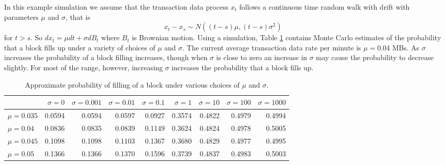 \documentclass{article}
\begin{document}
In this example simulation we assume that the transaction data process $x_t$ follows a continuous time random walk with drift with parameters $\mu$ and $\sigma$, that is
\[
x_t - x_s \sim N((t-s)\mu, (t-s)\sigma^2)
\]
for $t > s$. So $dx_t = \mu dt + \sigma d B_t$ where $B_t$ is Brownian motion. Using a simulation, Table \ref{tab:bmprob} contains Monte Carlo estimates of the probability that a block fills up under a variety of choices of $\mu$ and $\sigma$. The current average transaction data rate per minute  is $\mu=0.04$ MBs. As $\sigma$ increases the probability of a block filling increases, though when $\sigma$ is close to zero an increase in $\sigma$ may cause the probability to decrease slightly. For most of the range, however, increasing $\sigma$ increases the probability that a block fills up. 

\begin{table}[ht]
\centering
\begin{tabular}{lrrrrrrrr}
  \hline
 & $\sigma = 0$ & $\sigma = 0.001$ & $\sigma = 0.01$ & $\sigma = 0.1$ & $\sigma = 1$ & $\sigma = 10$ & $\sigma = 100$ & $\sigma = 1000$ \\ 
  \hline
$\mu = 0.035$ & 0.0594 & 0.0594 & 0.0597 & 0.0927 & 0.3574 & 0.4822 & 0.4979 & 0.4994 \\ 
  $\mu = 0.04$ & 0.0836 & 0.0835 & 0.0839 & 0.1149 & 0.3624 & 0.4824 & 0.4978 & 0.5005 \\ 
  $\mu = 0.045$ & 0.1098 & 0.1098 & 0.1103 & 0.1367 & 0.3680 & 0.4829 & 0.4977 & 0.4995 \\ 
  $\mu = 0.05$ & 0.1366 & 0.1366 & 0.1370 & 0.1596 & 0.3739 & 0.4837 & 0.4983 & 0.5003 \\ 
   \hline
\end{tabular}
\caption{Approximate probability of filling of a block under various choices of $\mu$ and $\sigma$.}
\label{tab:bmprob}
\end{table}
\end{document}
